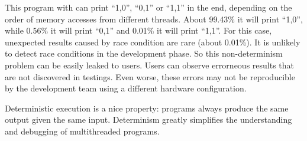 \label{sec:nondeterminism}
This program with \pthreads{} can print ``1,0'', ``0,1'' or ``1,1'' in the end, 
depending on the order of memory accesses from different threads. 
About 99.43\% it will print ``1,0'', while 0.56\% it will print ``0,1''
and 0.01\% it will print ``1,1''.
For this case, unexpected results caused by race condition are rare (about 0.01\%). 
It is unlikely to detect race conditions in the development phase. 
So this non-determinism problem can be easily leaked to users.
Users can observe errorneous results that are not discovered in testings. 
Even worse, these errors may not be reproducible by the development team using
a different hardware configuration. 

Deterministic execution is a nice property: programs always produce 
the same output given the same input.
Determinism greatly simplifies the understanding and debugging of multithreaded programs.

